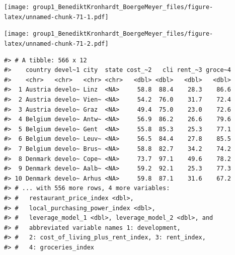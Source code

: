 \documentclass[
  11pt,
  a4paper,
  twoside]{scrbook}
\newenvironment{Shaded}{\begin{snugshade}}{\end{snugshade}}
\newcommand{\AttributeTok}[1]{\textcolor[rgb]{0.77,0.63,0.00}{#1}}
\newcommand{\FloatTok}[1]{\textcolor[rgb]{0.00,0.00,0.81}{#1}}
\newcommand{\FunctionTok}[1]{\textcolor[rgb]{0.00,0.00,0.00}{#1}}
\newcommand{\NormalTok}[1]{#1}
\newcommand{\OtherTok}[1]{\textcolor[rgb]{0.56,0.35,0.01}{#1}}
\newcommand{\SpecialCharTok}[1]{\textcolor[rgb]{0.00,0.00,0.00}{#1}}
\newcommand{\StringTok}[1]{\textcolor[rgb]{0.31,0.60,0.02}{#1}}
\begin{document}
\linespread{1}\texttt{[image: group1\_BenediktKronhardt\_BoergeMeyer\_files/figure-latex/unnamed-chunk-71-1.pdf]} \linespread{1}

\begin{Shaded}
\end{Shaded}

\linespread{1}\texttt{[image: group1\_BenediktKronhardt\_BoergeMeyer\_files/figure-latex/unnamed-chunk-71-2.pdf]} \linespread{1}

\begin{Shaded}
\end{Shaded}

\linespread{1}

\begin{verbatim}
#> # A tibble: 566 x 12
#>    country devel~1 city  state cost_~2   cli rent_~3 groce~4
#>    <chr>   <chr>   <chr> <chr>   <dbl> <dbl>   <dbl>   <dbl>
#>  1 Austria develo~ Linz  <NA>     58.8  88.4    28.3    86.6
#>  2 Austria develo~ Vien~ <NA>     54.2  76.0    31.7    72.4
#>  3 Austria develo~ Graz  <NA>     49.4  75.0    23.0    72.6
#>  4 Belgium develo~ Antw~ <NA>     56.9  86.2    26.6    79.6
#>  5 Belgium develo~ Gent  <NA>     55.8  85.3    25.3    77.1
#>  6 Belgium develo~ Leuv~ <NA>     56.5  84.4    27.8    85.5
#>  7 Belgium develo~ Brus~ <NA>     58.8  82.7    34.2    74.2
#>  8 Denmark develo~ Cope~ <NA>     73.7  97.1    49.6    78.2
#>  9 Denmark develo~ Aalb~ <NA>     59.2  92.1    25.3    77.3
#> 10 Denmark develo~ Arhus <NA>     59.8  87.1    31.6    67.2
#> # ... with 556 more rows, 4 more variables:
#> #   restaurant_price_index <dbl>,
#> #   local_purchasing_power_index <dbl>,
#> #   leverage_model_1 <dbl>, leverage_model_2 <dbl>, and
#> #   abbreviated variable names 1: development,
#> #   2: cost_of_living_plus_rent_index, 3: rent_index,
#> #   4: groceries_index
\end{verbatim}
\end{document}
